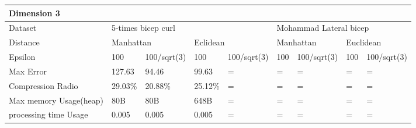 \documentclass[10pt, conference, compsocconf]{IEEEtran}
\begin{document}
\begin{table}[]
    \begin{tabular}{|l|l|l|l|l|l|l|l|l|}
    \hline
    \multicolumn{9}{|l|}{Dimension 3}                                                                                                                         \\ \hline
    Dataset                & \multicolumn{4}{l|}{5-times bicep curl}                        & \multicolumn{4}{l|}{Mohammad Lateral bicep}                     \\ \hline
    Distance               & \multicolumn{2}{l|}{Manhattan} & \multicolumn{2}{l|}{Eclidean} & \multicolumn{2}{l|}{Manhattan} & \multicolumn{2}{l|}{Euclidean} \\ \hline
    Epsilon                & 100          & 100/sqrt(3)     & 100         & 100/sqrt(3)     & 100        & 100/sqrt(3)       & 100        & 100/sqrt(3)       \\ \hline
    Max Error              & 127.63       & 94.46           & 99.63       & =               & =          & =                 & =          & =                 \\ \hline
    Compression Radio      & 29.03\%      & 20.88\%         & 25.12\%     & =               & =          & =                 & =          & =                 \\ \hline
    Max memory Usage(heap) & 80B          & 80B             & 648B        & =               & =          & =                 & =          & =                 \\ \hline
    processing time Usage  & 0.005        & 0.005           & 0.005       & =               & =          & =                 & =          & =                 \\ \hline
    \end{tabular}
\end{table}




\end{document}
